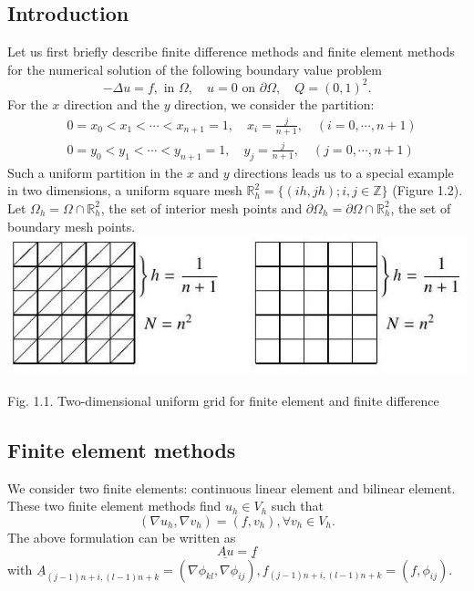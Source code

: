 \documentclass[10pt]{article}
\begin{document}
\subsection{Introduction}
Let us first briefly describe finite difference methods and finite element methods for the numerical solution of the following boundary value problem
$$
-\Delta u=f, \text { in } \Omega, \quad u=0 \text { on } \partial \Omega, \quad Q=(0,1)^{2} .
$$
For the $x$ direction and the $y$ direction, we consider the partition:
$$
\begin{aligned}
&0=x_{0}<x_{1}<\cdots<x_{n+1}=1, \quad x_{i}=\frac{j}{n+1}, \quad(i=0, \cdots, n+1) \\
&0=y_{0}<y_{1}<\cdots<y_{n+1}=1, \quad y_{j}=\frac{j}{n+1}, \quad(j=0, \cdots, n+1)
\end{aligned}
$$
Such a uniform partition in the $x$ and $y$ directions leads us to a special example in two dimensions, a uniform square mesh $\mathbb{R}_{h}^{2}=\{(i h, j h) ; i, j \in \mathbb{Z}\}$ (Figure 1.2). Let $\Omega_{h}=\Omega \cap \mathbb{R}_{h}^{2}$, the set of interior mesh points and $\partial \Omega_{h}=\partial \Omega \cap \mathbb{R}_{h}^{2}$, the set of boundary mesh points.\\

\includegraphics[max width=\textwidth]{2022_01_06_c2f144dbff0f0a17cc7dg-5}

Fig. 1.1. Two-dimensional uniform grid for finite element and finite difference

\subsection{Finite element methods}
We consider two finite elements: continuous linear element and bilinear element. These two finite element methods find $u_{h} \in V_{h}$ such that
$$
\left(\nabla u_{h}, \nabla v_{h}\right)=\left(f, v_{h}\right), \forall v_{h} \in V_{h} .
$$
The above formulation can be written as
$$
\underline{A u}=\underline{f}
$$
with $\underline{A}_{(j-1) n+i,(l-1) n+k}=\left(\nabla \phi_{k l}, \nabla \phi_{i j}\right), f_{(j-1) n+i,(l-1) n+k}=\left(f, \phi_{i j}\right) .$
\end{document}
